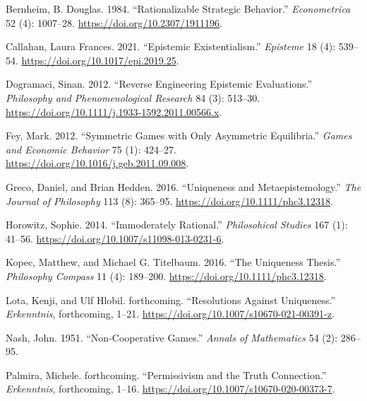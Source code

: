 \documentclass[
  11pt,
]{article}
\newlength{\cslhangindent}
\newlength{\cslentryspacingunit} %
\newenvironment{CSLReferences}[2] %
 {%
  \setlength{\parindent}{0pt}
  \ifodd #1
  \let\oldpar\par
  \def\par{\hangindent=\cslhangindent\oldpar}
  \fi
  \setlength{\parskip}{#2\cslentryspacingunit}
 }%
 {}
\begin{document}
\hypertarget{refs}{}
\begin{CSLReferences}{1}{0}
\leavevmode{}%
Bernheim, B. Douglas. 1984. {``Rationalizable Strategic Behavior.''} \emph{Econometrica} 52 (4): 1007--28. \url{https://doi.org/10.2307/1911196}.

\leavevmode{}%
Callahan, Laura Frances. 2021. {``Epistemic Existentialism.''} \emph{Episteme} 18 (4): 539--54. \url{https://doi.org/10.1017/epi.2019.25}.

\leavevmode{}%
Dogramaci, Sinan. 2012. {``Reverse Engineering Epistemic Evaluations.''} \emph{Philosophy and Phenomenological Research} 84 (3): 513--30. \url{https://doi.org/10.1111/j.1933-1592.2011.00566.x}.

\leavevmode{}%
Fey, Mark. 2012. {``Symmetric Games with Only Asymmetric Equilibria.''} \emph{Games and Economic Behavior} 75 (1): 424--27. \url{https://doi.org/10.1016/j.geb.2011.09.008}.

\leavevmode{}%
Greco, Daniel, and Brian Hedden. 2016. {``Uniqueness and Metaepistemology.''} \emph{The Journal of Philosophy} 113 (8): 365--95. \url{https://doi.org/10.1111/phc3.12318}.

\leavevmode{}%
Horowitz, Sophie. 2014. {``Immoderately Rational.''} \emph{Philosohical Studies} 167 (1): 41--56. \url{https://doi.org/10.1007/s11098-013-0231-6}.

\leavevmode{}%
Kopec, Matthew, and Michael G. Titelbaum. 2016. {``The Uniqueness Thesis.''} \emph{Philosophy Compass} 11 (4): 189--200. \url{https://doi.org/10.1111/phc3.12318}.

\leavevmode{}%
Lota, Kenji, and Ulf Hlobil. forthcoming. {``Resolutions Against Uniqueness.''} \emph{Erkenntnis}, forthcoming, 1--21. \url{https://doi.org/10.1007/s10670-021-00391-z}.

\leavevmode{}%
Nash, John. 1951. {``Non-Cooperative Games.''} \emph{Annals of Mathematics} 54 (2): 286--95.

\leavevmode{}%
Palmira, Michele. forthcoming. {``Permissivism and the Truth Connection.''} \emph{Erkenntnis}, forthcoming, 1--16. \url{https://doi.org/10.1007/s10670-020-00373-7}.


\end{CSLReferences}
\end{document}
